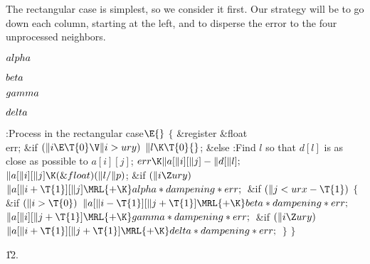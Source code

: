 The rectangular case is simplest, so we consider it
first. Our strategy
will be to go down each column, starting at the left, and to disperse the
error to the four unprocessed neighbors.

\Y\B\4\D$\\{alpha}$ \5
\par
\B\4\D$\\{beta}$ \5
\par
\B\4\D$\\{gamma}$ \5
\par
\B\4\D$\\{delta}$ \5
\par
\Y\B\4:Process  in the rectangular case\X${}\E{}$\6
${}\{{}$\5
\1\&{register} \&{float} \\{err};\7
\&{if} ${}(\|i\E\T{0}\V\|i>\\{ury}){}$\1\5
${}\|l\K\T{0}{}$;\2\6
\&{else}\1\5
:Find $l$ so that $d[l]$ is as close as possible to $a[i][j]$\X;\2\6
${}\\{err}\K\|a[\|i][\|j]-\|d[\|l];{}$\6
${}\|a[\|i][\|j]\K(\&{float})(\|l/\|p){}$;\6
\&{if} ${}(\|i\Z\\{ury}){}$\1\5
${}\|a[\|i+\T{1}][\|j]\MRL{+{\K}}\\{alpha}*\\{dampening}*\\{err};{}$\2\6
\&{if} ${}(\|j<\\{urx}-\T{1}){}$\5
${}\{{}$\1\6
\&{if} ${}(\|i>\T{0}){}$\1\5
${}\|a[\|i-\T{1}][\|j+\T{1}]\MRL{+{\K}}\\{beta}*\\{dampening}*\\{err};{}$\2\6
${}\|a[\|i][\|j+\T{1}]\MRL{+{\K}}\\{gamma}*\\{dampening}*\\{err};{}$\6
\&{if} ${}(\|i\Z\\{ury}){}$\1\5
${}\|a[\|i+\T{1}][\|j+\T{1}]\MRL{+{\K}}\\{delta}*\\{dampening}*\\{err};{}$\2\6
\4${}\}{}$\2\6
\4${}\}{}$\2\par
\U12.\fi


